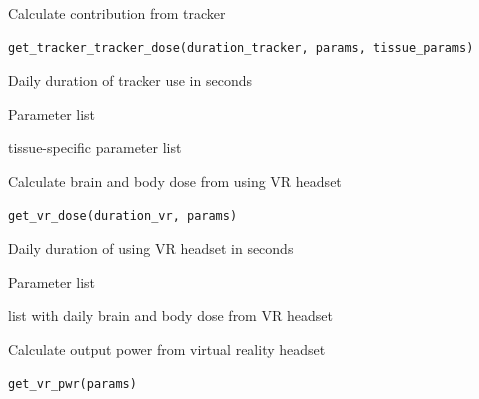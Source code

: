 \documentclass[a4paper]{book}
\begin{document}
%
\begin{Description}
Calculate contribution from tracker
\end{Description}
%
\begin{Usage}
\begin{verbatim}
get_tracker_tracker_dose(duration_tracker, params, tissue_params)
\end{verbatim}
\end{Usage}
%
\begin{Arguments}
\begin{ldescription}
\item[\code{duration\_tracker}] Daily duration of tracker use in seconds

\item[\code{params}] Parameter list

\item[\code{tissue\_params}] tissue-specific parameter list
\end{ldescription}
\end{Arguments}
%
\begin{Description}
Calculate brain and body dose from using VR headset
\end{Description}
%
\begin{Usage}
\begin{verbatim}
get_vr_dose(duration_vr, params)
\end{verbatim}
\end{Usage}
%
\begin{Arguments}
\begin{ldescription}
\item[\code{duration\_vr}] Daily duration of using VR headset in seconds

\item[\code{params}] Parameter list
\end{ldescription}
\end{Arguments}
%
\begin{Value}
list with daily brain and body dose from VR headset
\end{Value}
%
\begin{Description}
Calculate output power from virtual reality headset
\end{Description}
%
\begin{Usage}
\begin{verbatim}
get_vr_pwr(params)
\end{verbatim}
\end{Usage}
\end{document}
